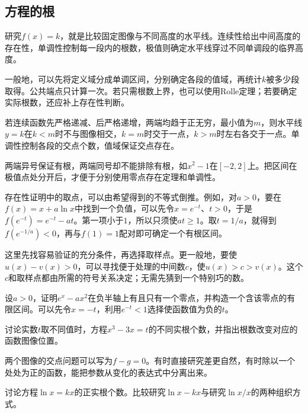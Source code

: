 \begingroup
\setlength{\parskip}{3.5pt}
\setlength{\abovedisplayskip}{10pt}
\setlength{\belowdisplayskip}{10pt}
\subsection{方程的根}

研究\(f(x)=k\)，就是比较固定图像与不同高度的水平线。连续性给出中间高度的存在性，单调性控制每一段内的根数，极值则确定水平线穿过不同单调段的临界高度。

一般地，可以先将定义域分成单调区间，分别确定各段的值域，再统计\(k\)被多少段取得。公共端点只计算一次。若只需根数上界，也可以使用Rolle定理；若要确定实际根数，还应补上存在性判断。

若连续函数先严格递减、后严格递增，两端均趋于正无穷，最小值为\(m\)，则水平线\(y=k\)在\(k<m\)时不与图像相交，\(k=m\)时交于一点，\(k>m\)时左右各交于一点。单调性控制各段的交点个数，值域保证交点存在。

两端异号保证有根，两端同号却不能排除有根，如\(x^2-1\)在\([-2,2]\)上。把区间在极值点处分开后，才便于分别使用零点存在定理和单调性。

存在性证明中的取点，可以由希望得到的不等式倒推。例如，对\(a>0\)，要在\(f(x)=x+a\ln x\)中找到一个负值，可以先令\(x=e^{-t}\)、\(t>0\)，于是\(f(e^{-t})=e^{-t}-at\)。第一项小于\(1\)，所以只须使\(at\ge1\)。取\(t=1/a\)，就得到\(f(e^{-1/a})<0\)，再与\(f(1)=1\)配对即可确定一个有根区间。

这里先找容易验证的充分条件，再选择取样点。更一般地，要使\(u(x)-v(x)>0\)，可以寻找便于处理的中间数\(c\)，使\(u(x)>c>v(x)\)。这个\(c\)和取样点都由所需的符号关系决定；无需先猜到一个特别巧的数。

\begin{example}
设\(a>0\)，证明\(e^x-ax^2\)在负半轴上有且只有一个零点，并构造一个含该零点的有限区间。可以先令\(x=-t\)，利用\(e^{-t}<1\)选择使函数值为负的\(t\)。
\end{example}

\begin{example}
讨论实数\(t\)取不同值时，方程\(x^3-3x=t\)的不同实根个数，并指出根数改变对应的函数图像位置。
\end{example}

两个图像的交点问题可以写为\(f-g=0\)。有时直接研究差更自然，有时除以一个处处为正的函数，能把参数从变化的表达式中分离出来。

\begin{example}
讨论方程\(\ln x=kx\)的正实根个数。比较研究\(\ln x-kx\)与研究\(\ln x/x\)的两种组织方式。
\end{example}


